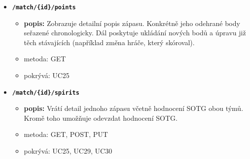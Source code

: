 \begin{itemize}
\begin{itemize}
  \end{itemize}
  \item \texttt{\textbf{/match/\{id\}/points}}
  \begin{itemize}
    \item \textbf{popis:} Zobrazuje detailní popis zápasu. Konkrétně jeho odehrané body seřazené chronologicky.
      Dál poskytuje ukládání nových bodů a úpravu již těch stávajících (například změna hráče, který skóroval).
    \item metoda: GET
    \item pokrývá: UC25
  \end{itemize}
  \item \texttt{\textbf{/match/\{id\}/spirits}}
  \begin{itemize}
    \item \textbf{popis:} Vrátí detail jednoho zápasu včetně hodnocení SOTG obou týmů. Kromě toho umožňuje odevzdat hodnocení SOTG.
    \item metoda: GET, POST, PUT
    \item pokrývá: UC25, UC29, UC30
  \end{itemize}
\end{itemize}